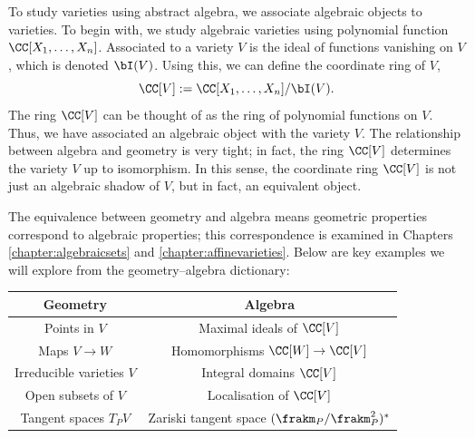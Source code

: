 \documentclass[12pt]{amsart}
\theoremstyle{plain}
\begin{document}
To study varieties using abstract algebra, we associate algebraic objects to varieties.
To begin with, we study algebraic varieties using polynomial function $\CC[X_1, \ldots, X_n]$.
Associated to a variety $V$ is the ideal of functions vanishing on $V$, which is denoted $\bI(V)$.
Using this, we can define the coordinate ring of $V$, 
$$\CC[V] := \CC[X_1, \ldots, X_n] / \bI(V).$$
The ring $\CC[V]$ can be thought of as the ring of polynomial functions on $V$.
Thus, we have associated an algebraic object with the variety $V$.
The relationship between algebra and geometry is very tight;
in fact, the ring $\CC[V]$ determines the variety $V$ up to isomorphism.
In this sense, the coordinate ring $\CC[V]$ is not just an algebraic shadow of $V$, but in fact, an equivalent object.

The equivalence between geometry and algebra means geometric properties correspond to algebraic properties;
this correspondence is examined in Chapters \ref{chapter:algebraicsets} and \ref{chapter:affinevarieties}.
Below are key examples we will explore from the geometry--algebra dictionary:
\begin{center}
\begin{tabular}{c | c}
	Geometry & Algebra \\
	\hline
	Points in $V$ & Maximal ideals of $\CC[V]$ \\
	Maps $V \to W$ & Homomorphisms $\CC[W] \to \CC[V]$ \\
	Irreducible varieties $V$ & Integral domains $\CC[V]$ \\
	Open subsets of $V$ & Localisation of $\CC[V]$ \\
	Tangent spaces $T_PV$ &  Zariski tangent space $(\frakm_P / \frakm_P^2)^*$
\end{tabular}
\end{center}
\end{document}
